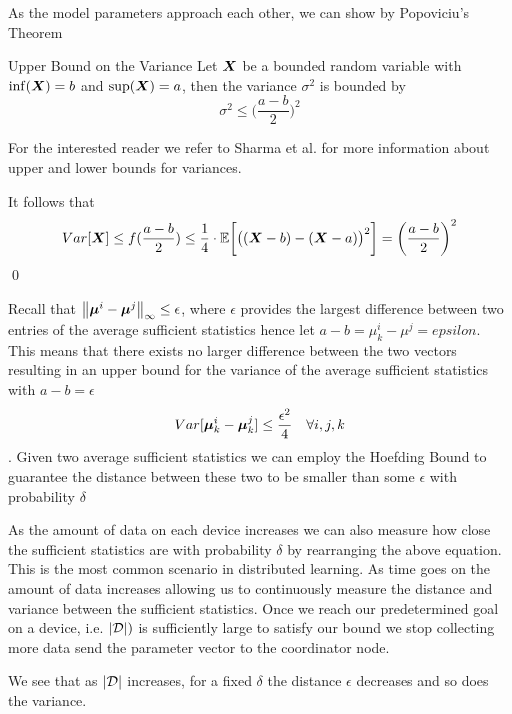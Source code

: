 As the model parameters approach each other, we can show by Popoviciu's Theorem \cite{popoviciu1935equations} 
\begin{threm}{Upper Bound on the Variance}
    Let $\boldsymbol{X}$ be a bounded random variable with $\inf(\boldsymbol{X}) = b$ and $\sup(\boldsymbol{X}) = a$, 
    then the variance $\sigma^2$ is bounded by 
    \begin{equation}
        \sigma^2 \leq \bigg(\frac{a-b}{2}\bigg)^{2}
    \end{equation}
\end{threm}

For the interested reader we refer to Sharma et al. \cite{sharma2010betterbounds} for more information about upper and lower bounds for variances.



It follows that
\begin{equation*}
    Var[\boldsymbol{X}] \leq f(\frac{a-b}{2}) \leq  \frac{1}{4} \cdot \mathbb{E}\bigg[\big((\boldsymbol{X} - b) - (\boldsymbol{X} - a)\big)^2\bigg]  =  \bigg(\frac{a-b}{2}\bigg)^2 
\end{equation*}\qed

Recall that $\left\lVert\boldsymbol{\mu}^{i} -  \boldsymbol{\mu}^{j}\right\rVert_\infty \leq  \epsilon$, where $\epsilon$ provides the largest difference between two entries of the average sufficient statistics hence let $a - b = \mu^{i}_k - \mu^{j} = epsilon$.
This means that there exists no larger difference between the two vectors resulting in an upper bound for the variance of the average sufficient statistics with $a - b = \epsilon$ 
\begin{equation*}
    Var[\boldsymbol{\mu}^{i}_k -  \boldsymbol{\mu}^{j}_k] \leq \frac{\epsilon^2}{4} \quad \forall i,j,k
\end{equation*}.
Given two average sufficient statistics we can employ the Hoefding Bound to guarantee the distance between these two to be smaller than some $\epsilon$ with probability $\delta$


As the amount of data on each device increases we can also measure how close the sufficient statistics are with probability $\delta$ by rearranging the above equation. 
This is the most common scenario in distributed learning. As time goes on the amount of data increases allowing us to continuously measure the distance and variance between the sufficient statistics.
Once we reach our predetermined goal on a device, i.e. $\abs{\mathcal{D}}^^i$ is sufficiently large to satisfy our bound we stop collecting more data send the parameter vector to the coordinator node.


We see that as $\lvert\mathcal{D}\rvert$ increases, for a fixed $\delta$ the distance $\epsilon$ decreases and so does the variance. 


